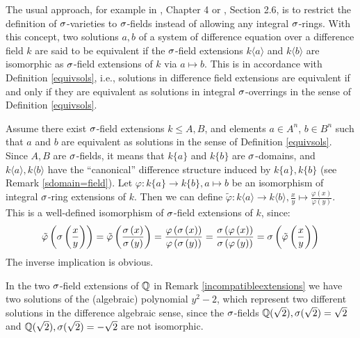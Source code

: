 \begin{rem}
The usual approach, for example in \cite{cohn}, Chapter 4 or \cite{levin}, Section 2.6, is to restrict the definition of $\sigma$-varieties to $\sigma$-fields instead of allowing any integral $\sigma$-rings. With this concept,
two solutions $a,b$ of a system of difference equation over a difference field $k$ are said to be equivalent if the $\sigma$-field extensions $k\langle a \rangle$ and $k\langle b \rangle$ are isomorphic as $\sigma$-field extensions of $k$ via $a \mapsto b$.
This is in accordance with Definition \ref{equivsols}, i.e., solutions in difference field extensions are equivalent if and only if they are equivalent as solutions in integral $\sigma$-overrings in the sense of Definition \ref{equivsols}.
\begin{bew}
Assume there exist $\sigma$-field extensions $k \leq A,B$, and elements $a \in A^n$, $b \in B^n$ such that $a$ and $b$ are equivalent as solutions in the sense of Definition \ref{equivsols}. Since $A,B$ are $\sigma$-fields, it means that $k\{a\}$ and $k\{b\}$ are $\sigma$-domains, 
and $k\langle a \rangle, k\langle b \rangle$ have the ``canonical'' difference structure induced by $k\{a\}, k\{b\}$ (see Remark \ref{sdomain=field}). Let $\varphi: k\{a\} \rightarrow k\{b\}, a \mapsto b$ be an isomorphism of integral $\sigma$-ring extensions of $k$.
Then we can define $\tilde \varphi: k \langle a \rangle \rightarrow k\langle b \rangle, \frac{x}{y} \mapsto \frac{\varphi(x)}{\varphi{(y)}}$. This is a well-defined isomorphism of $\sigma$-field extensions of $k$, since:
\begin{align*}
\tilde \varphi \left(\sigma \left(\frac{x}{y}\right)\right) = \tilde \varphi \left( \frac{\sigma \left(x\right)}{\sigma \left(y\right)}\right) = \frac{ \varphi \left(\sigma \left(x\right)\right)}{ \varphi \left(\sigma \left(y\right)\right)} =  \frac{\sigma \left(\varphi \left(x\right)\right)}{\sigma \left(\varphi \left(y\right)\right)} = \sigma \left( \tilde \varphi \left(\frac{x}{y}\right)\right)
\end{align*}
The inverse implication is obvious.
\end{bew}
\end{rem}

\begin{ex}
In the two $\sigma$-field extensions of $\mathbb{Q}$ in Remark \ref{incompatibleextensions} we have two solutions of the (algebraic) polynomial $y^2-2$, which represent two different solutions in the difference algebraic sense,
since the $\sigma$-fields $\mathbb{Q}(\sqrt{2}), \sigma(\sqrt{2}) = \sqrt{2}$ and $\mathbb{Q}(\sqrt{2}), \sigma(\sqrt{2}) = -\sqrt{2}$ are not isomorphic. 
\end{ex}

